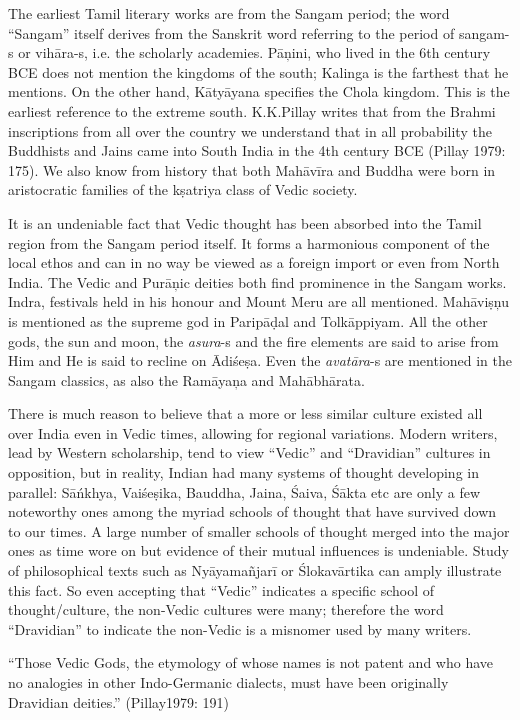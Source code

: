 The earliest Tamil literary works are from the Sangam period; the word “Sangam” itself derives from the Sanskrit word referring to the period of sangam-s or vihāra-s, i.e. the scholarly academies. Pāņini, who lived in the 6th century BCE does not mention the kingdoms of the south; Kalinga is the farthest that he mentions. On the other hand, Kātyāyana specifies the Chola kingdom. This is the earliest reference to the extreme south. K.K.Pillay writes that from the Brahmi inscriptions from all over the country we understand that in all probability the Buddhists and Jains came into South India in the 4th century BCE (Pillay 1979: 175). We also know from history that both Mahāvīra and Buddha were born in aristocratic families of the kṣatriya class of Vedic society.

It is an undeniable fact that Vedic thought has been absorbed into the Tamil region from the Sangam period itself. It forms a harmonious component of the local ethos and can in no way be viewed as a foreign import or even from North India. The Vedic and Purāņic deities both find prominence in the Sangam works. Indra, festivals held in his honour and Mount Meru are all mentioned. Mahāviṣņu is mentioned as the supreme god in Paripāḍal and Tolkāppiyam. All the other gods, the sun and moon, the \textit{asura}-s and the fire elements are said to arise from Him and He is said to recline on Ādiśeṣa. Even the \textit{avatāra}-s are mentioned in the Sangam classics, as also the Ramāyaņa and Mahābhārata.

There is much reason to believe that a more or less similar culture existed all over India even in Vedic times, allowing for regional variations. Modern writers, lead by Western scholarship, tend to view “Vedic” and “Dravidian” cultures in opposition, but in reality, Indian had many systems of thought developing in parallel: Sāńkhya, Vaiśeṣika, Bauddha, Jaina, Śaiva, Śākta etc are only a few noteworthy ones among the myriad schools of thought that have survived down to our times. A large number of smaller schools of thought merged into the major ones as time wore on but evidence of their mutual influences is undeniable. Study of philosophical texts such as Nyāyamañjarī or Ślokavārtika can amply illustrate this fact. So even accepting that “Vedic” indicates a specific school of thought/culture, the non-Vedic cultures were many; therefore the word “Dravidian” to indicate the non-Vedic is a misnomer used by many writers.

\begin{myquote}
“Those Vedic Gods, the etymology of whose names is not patent and who have no analogies in other Indo-Germanic dialects, must have been originally Dravidian deities.” (Pillay1979: 191)
\end{myquote}

